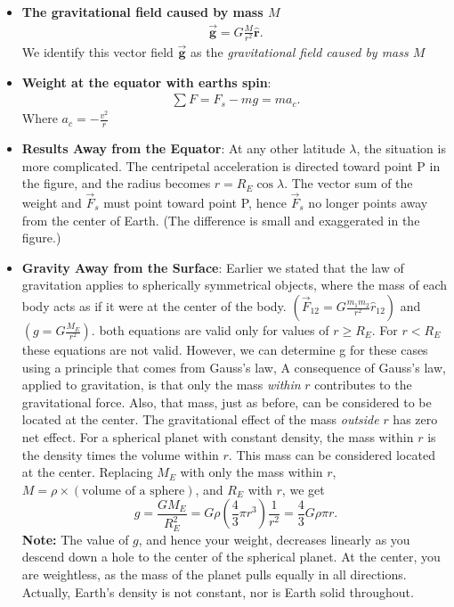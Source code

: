 \documentclass{report}
\begin{document}
\begin{itemize}
        \item \textbf{The gravitational field caused by mass $M$}
            \begin{align*}
                \vec{\mathbf{g}} = G \frac{M}{r^{2}}\hat{\mathbf{r}}
            .\end{align*}
            \bigbreak \noindent 
            We identify this vector field $\vec{\mathbf{g}}$ as the \textit{gravitational field caused by mass $M$}
        \item \textbf{Weight at the equator with earths spin}:
            \begin{align*}
                \sum F = F_{s} -mg = ma_{c}
            .\end{align*}
            Where $a_{c} = -\frac{v^{2}}{r} $
        \item \textbf{Results Away from the Equator}:
            At any other latitude $\lambda$, the situation is more complicated. The centripetal acceleration is directed toward point P in the figure, and the radius becomes $r = R_E \cos \lambda$. The vector sum of the weight and $\vec{F}_s$ must point toward point P, hence $\vec{F}_s$ no longer points away from the center of Earth. (The difference is small and exaggerated in the figure.)
            \bigbreak \noindent
        \item \textbf{Gravity Away from the Surface}: Earlier we stated that the law of gravitation applies to spherically symmetrical objects, where the mass of each body acts as if it were at the center of the body. $\left(\vec{F}_{12} = G \frac{m_1 m_2}{r^2} \hat{r}_{12}\right)$ and $\left(g = G \frac{M_E}{r^2}\right) $. 
            \bigbreak \noindent 
            both equations are valid only for values of $r \geq R_{E}$. For $r < R_{E}$ these equations are not valid. However, we can determine g for these cases using a principle that comes from Gauss’s law,
            \bigbreak \noindent 
            A consequence of Gauss’s law, applied to gravitation, is that only the mass \textit{within} $r$ contributes to the gravitational force. Also, that mass, just as before, can be considered to be located at the center. The gravitational effect of the mass \textit{outside} $r$ has zero net effect.
            \bigbreak \noindent 
            For a spherical planet with constant density, the mass within $r$ is the density times the volume within $r$. This mass can be considered located at the center. Replacing $M_E$ with only the mass within $r$, $M = \rho \times (\text{volume of a sphere})$, and $R_E$ with $r$, we get 
            \[ g = \frac{G M_E}{R_E^2} = G \rho \left( \frac{4}{3} \pi r^3 \right) \frac{1}{r^2} = \frac{4}{3} G \rho \pi r. \]
            \bigbreak \noindent 
            \textbf{Note:} The value of $g$, and hence your weight, decreases linearly as you descend down a hole to the center of the spherical planet. At the center, you are weightless, as the mass of the planet pulls equally in all directions.
            \bigbreak \noindent 
            Actually, Earth’s density is not constant, nor is Earth solid throughout.




\end{itemize}
\end{document}
